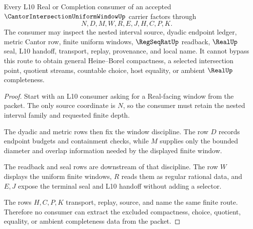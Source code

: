 \begin{theorem}
\label{thm:cantor-intersection-uniform-window-l10-handoff}
Every L10 Real or Completion consumer of an accepted $\CantorIntersectionUniformWindowUp$ carrier factors through
$$
N,D,M,W,R,E,J,H,C,P,K .
$$
The consumer may inspect the nested interval source, dyadic endpoint ledger, metric Cantor row, finite uniform windows, $\RegSeqRatUp$ readback, $\RealUp$ seal, L10 handoff, transport, replay, provenance, and local name. It cannot bypass this route to obtain general Heine--Borel compactness, a selected intersection point, quotient streams, countable choice, host equality, or ambient $\RealUp$ completeness.
\end{theorem}
\begin{proof}
Start with an L10 consumer asking for a Real-facing window from the packet. The only source coordinate is $N$, so the consumer must retain the nested interval family and requested finite depth.

The dyadic and metric rows then fix the window discipline. The row $D$ records endpoint budgets and containment checks, while $M$ supplies only the bounded diameter and overlap information needed by the displayed finite window.

The readback and seal rows are downstream of that discipline. The row $W$ displays the uniform finite windows, $R$ reads them as regular rational data, and $E,J$ expose the terminal seal and L10 handoff without adding a selector.

The rows $H,C,P,K$ transport, replay, source, and name the same finite route. Therefore no consumer can extract the excluded compactness, choice, quotient, equality, or ambient completeness data from the packet.
\end{proof}


